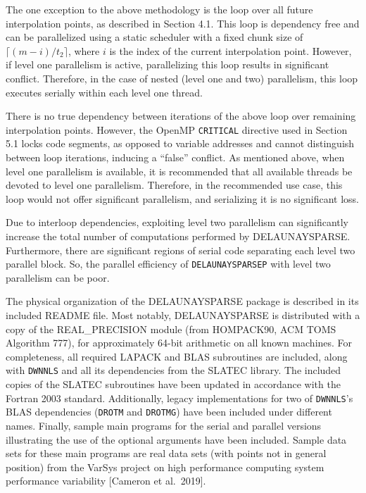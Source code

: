 The one exception to the above methodology is the loop over all future
interpolation points, as described in Section 4.1. This loop is dependency
free and can be parallelized using a static scheduler with a fixed chunk
size of $\lceil(m-i)/t_2\rceil$, where $i$ is the index of the current
interpolation
point. However, if level one parallelism is active, parallelizing this
loop results in significant conflict. Therefore, in the case of nested
(level one and two) parallelism, this loop executes serially within
each level one thread.

\enspace
There is no true dependency between iterations of the above loop over
remaining interpolation points. However, the OpenMP {\tt CRITICAL}
directive used in Section 5.1 locks code segments, as opposed to
variable addresses and cannot distinguish between loop
iterations, inducing a ``false'' conflict. As mentioned above, when
level one parallelism is available, it is recommended that all
available threads be devoted to level one parallelism. Therefore, in
the recommended use case, this loop would not offer significant
parallelism, and serializing it is no significant loss.
\medskip

Due to interloop dependencies, exploiting level two parallelism can
significantly increase the total number of computations performed by
DELAUNAYSPARSE. Furthermore, there are significant regions of serial
code separating each level two parallel block. So, 
the parallel efficiency of {\tt DELAUNAYSPARSEP} with level two
parallelism can be poor.


The physical organization of the DELAUNAYSPARSE package is described
in its included README file. Most notably, DELAUNAYSPARSE is distributed
with a copy of the REAL\_PRECISION module (from HOMPACK90, ACM TOMS
Algorithm 777), for approximately 64-bit arithmetic on all known
machines. For completeness, all required LAPACK and BLAS subroutines
are included, along with {\tt DWNNLS} and all its dependencies from
the SLATEC library. The included copies of the SLATEC subroutines have
been updated in accordance with the Fortran 2003 standard. Additionally,
legacy implementations for two of {\tt DWNNLS}'s BLAS dependencies 
({\tt DROTM} and {\tt DROTMG}) have
been included under different names. Finally, sample main programs
for the serial and parallel versions illustrating the use of the
optional arguments have been included.
Sample data sets for these main programs are real data sets (with points
not in general position) from the VarSys project on high performance
computing system performance variability [Cameron et al.\ 2019].

